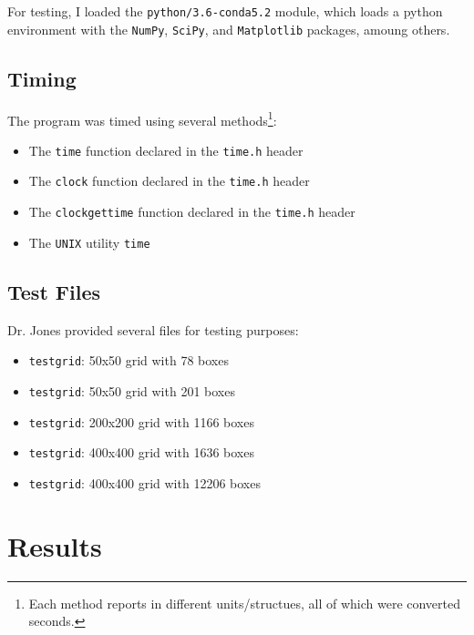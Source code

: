 \documentclass{article}
\begin{document}
For testing, I loaded the \texttt{python/3.6-conda5.2} module, which loads a
python environment with the \texttt{NumPy}, \texttt{SciPy}, and
\texttt{Matplotlib} packages, amoung others.

\subsection*{Timing}
\label{subsec:timing}

The program was timed using several methods\footnote{Each method reports in
different units/structues, all of which were converted seconds.}:

\begin{itemize}
    \item The \texttt{time} function declared in the \texttt{time.h} header
    \item The \texttt{clock} function declared in the \texttt{time.h} header
    \item The \texttt{clock\textunderscore gettime} function declared in the \texttt{time.h} header
    \item The \texttt{UNIX} utility \texttt{time}
\end{itemize}

\subsection*{Test Files}
\label{subsec:test_files}

Dr. Jones provided several files for testing purposes:

\begin{itemize}
    \item \texttt{testgrid}: 50x50 grid with 78 boxes
    \item \texttt{testgrid}: 50x50 grid with 201 boxes
    \item \texttt{testgrid}: 200x200 grid with 1166 boxes
    \item \texttt{testgrid}: 400x400 grid with 1636 boxes
    \item \texttt{testgrid}: 400x400 grid with 12206 boxes
\end{itemize}

\newpage
\section*{Results}
\label{sec:results}
\end{document}
